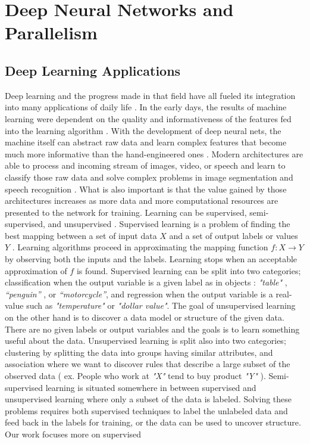 
\chapter{Deep Neural Networks and Parallelism} %

\label{Chapter2} %

\section{Deep Learning Applications}

Deep learning and the progress made in that field have all fueled its integration into many applications of daily life \cite{ddl}. In the early days, the results of machine learning were dependent on the quality and informativeness of the features fed into the learning algorithm \cite{csaji2001approximation}. With the development of deep neural nets, the machine itself can abstract raw data and learn complex features that become much more informative than the hand-engineered ones \cite{lecun2015deep}. Modern architectures are able to process and incoming stream of images, video, or speech and learn to classify those raw data and solve complex problems in image segmentation and speech recognition \cite{lecun2015deep, resnet, densenet}. What is also important is that the value gained by those architectures increases as more data and more computational resources are presented to the network for training. Learning can be supervised, semi-supervised, and unsupervised \cite{lecun2015deep}. Supervised learning is a problem of finding the best mapping between a set of input data $\mathit{X}$ and a set of output labels or values $\mathit{Y}$ \cite{lecun2015deep}. Learning algorithms proceed in approximating the mapping function $\mathit{ f : X \rightarrow Y}$ by observing both the inputs and the labels. Learning stops when an acceptable approximation of $\mathit{f}$ is found. Supervised learning can be split into two categories; classification when the output variable is a given label as in objects : \emph{"table"} , \emph{“penguin”} , or \emph{“motorcycle”}, and regression when the output variable is a real-value such as \emph{"temperature"} or \emph{"dollar value"}. The goal of unsupervised learning on the other hand is to discover a data model or structure of the given data. There are no given labels or output variables and the goals is to learn something useful about the data. Unsupervised learning is split also into two categories; clustering by splitting the data into groups having similar attributes, and association where we want to discover rules that describe a large subset of the observed data ( ex. People who work at \emph{"X"} tend to buy product \emph{"Y"} ). Semi-supervised learning is situated somewhere in between supervised and unsupervised learning where only a subset of the data is labeled. Solving these problems requires both supervised techniques to label the unlabeled data and feed back in the labels for training, or the data can be used to uncover structure. Our work focuses more on supervised 